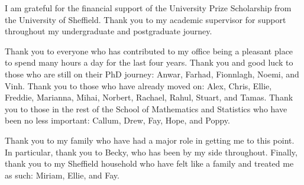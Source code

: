 \begin{acknowledgementslong}

I am grateful for the financial support of the University Prize Scholarship from the University of Sheffield. Thank you to my academic supervisor for support throughout my undergraduate and postgraduate journey.

Thank you to everyone who has contributed to my office being a pleasant place to spend many hours a day for the last four years. Thank you and good luck to those who are still on their PhD journey: Anwar, Farhad, Fionnlagh, Noemi, and Vinh. Thank you to those who have already moved on: Alex, Chris, Ellie, Freddie, Marianna, Mihai, Norbert, Rachael, Rahul, Stuart, and Tamas. Thank you to those in the rest of the School of Mathematics and Statistics who have been no less important: Callum, Drew, Fay, Hope, and Poppy.

Thank you to my family who have had a major role in getting me to this point. In particular, thank you to Becky, who has been by my side throughout. Finally, thank you to my Sheffield household who have felt like a family and treated me as such: Miriam, Ellie, and Fay.

\end{acknowledgementslong}